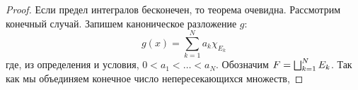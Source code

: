 \begin{proof}
	Если предел интегралов бесконечен, то теорема очевидна. Рассмотрим конечный случай. Запишем каноническое разложение $g$:
	\[
		g(x) = \sum_{k = 1}^N a_k \chi_{E_k}
	\]
	где, из определения и условия, $0 < a_1 < \ldots < a_N$. Обозначим $F = \bigsqcup_{k = 1}^N E_k$. Так как мы объединяем конечное число непересекающихся множеств, 
\end{proof}